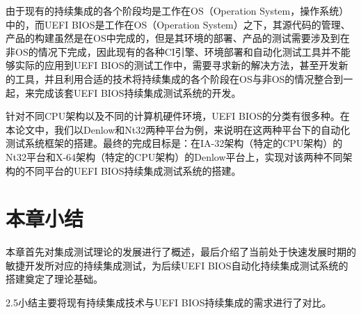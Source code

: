 	由于现有的持续集成的各个阶段均是工作在OS（Operation System，操作系统）中的，而UEFI BIOS是工作在OS（Operation System）之下，其源代码的管理、产品的构建虽然是在OS中完成的，但是其环境的部署、产品的测试需要涉及到在非OS的情况下完成，因此现有的各种CI引擎、环境部署和自动化测试工具并不能够实际的应用到UEFI BIOS的测试工作中，需要寻求新的解决方法，甚至开发新的工具，并且利用合适的技术将持续集成的各个阶段在OS与非OS的情况整合到一起，来完成该套UEFI BIOS持续集成测试系统的开发。
	
	针对不同CPU架构以及不同的计算机硬件环境，UEFI BIOS的分类有很多种。在本论文中，我们以Denlow和Nt32两种平台为例，来说明在这两种平台下的自动化测试系统框架的搭建。最终的完成目标是：在IA-32架构（特定的CPU架构）的Nt32平台和X-64架构（特定的CPU架构）的Denlow平台上，实现对该两种不同架构的不同平台的UEFI BIOS持续集成测试系统的搭建。
	
\section{本章小结}
    本章首先对集成测试理论的发展进行了概述，最后介绍了当前处于快速发展时期的敏捷开发所对应的持续集成测试，为后续UEFI BIOS自动化持续集成测试系统的搭建奠定了理论基础。
	
	2.5小结主要将现有持续集成技术与UEFI BIOS持续集成的需求进行了对比。